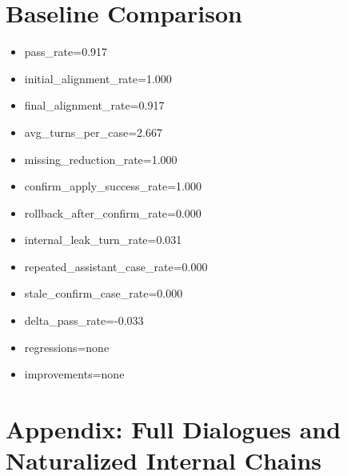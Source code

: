 \documentclass[11pt]{ctexart}
\begin{document}
\section{Baseline Comparison}
\begin{itemize}
\item pass\_rate=0.917
\item initial\_alignment\_rate=1.000
\item final\_alignment\_rate=0.917
\item avg\_turns\_per\_case=2.667
\item missing\_reduction\_rate=1.000
\item confirm\_apply\_success\_rate=1.000
\item rollback\_after\_confirm\_rate=0.000
\item internal\_leak\_turn\_rate=0.031
\item repeated\_assistant\_case\_rate=0.000
\item stale\_confirm\_case\_rate=0.000
\item delta\_pass\_rate=-0.033
\item regressions=none
\item improvements=none
\end{itemize}
\appendix
\section{Appendix: Full Dialogues and Naturalized Internal Chains}
\end{document}
